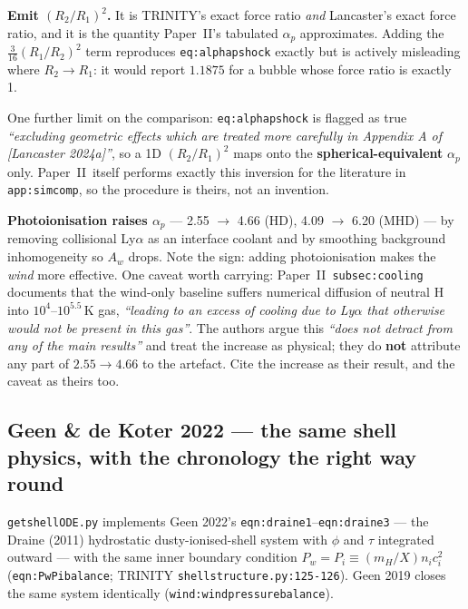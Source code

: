 \documentclass[11pt,a4paper,oneside]{report}
\newcommand{\brkus}{\textunderscore\allowbreak}
\newcommand{\code}[1]{\texttt{\small\let\_\brkus #1}}
\newcommand{\lbl}[1]{\texttt{\footnotesize\let\_\brkus #1}}
\newcommand{\PII}{Paper~II}
\newcommand{\ap}{\alpha_p}
\newcommand{\ci}{c_i}
\newcommand{\up}[1]{\textcolor{tqaccent}{\textbf{#1}}}
\begin{document}
\begin{keybox}
\up{Emit $(R_2/R_1)^2$.} It is TRINITY's exact force ratio \emph{and} Lancaster's exact force ratio,
and it is the quantity \PII's tabulated $\ap$ approximates. Adding the $\tfrac{3}{16}(R_1/R_2)^2$
term reproduces \lbl{eq:alphap\_shock} exactly but is actively misleading where $R_2\to R_1$: it
would report $1.1875$ for a bubble whose force ratio is exactly 1.
\end{keybox}

One further limit on the comparison: \lbl{eq:alphap\_shock} is flagged as true \emph{``excluding
geometric effects which are treated more carefully in Appendix A of [Lancaster 2024a]''}, so a 1D
$(R_2/R_1)^2$ maps onto the \up{spherical-equivalent} $\ap$ only. \PII\ itself performs exactly this
inversion for the literature in \lbl{app:sim\_comp}, so the procedure is theirs, not an invention.

\medskip
\textbf{Photoionisation raises $\ap$} --- 2.55 $\to$ 4.66 (HD), 4.09 $\to$ 6.20 (MHD) --- by
removing collisional Ly$\alpha$ as an interface coolant and by smoothing background
inhomogeneity so $A_w$ drops. Note the sign: adding photoionisation makes the \emph{wind}
more effective. One caveat worth carrying: \PII\ \lbl{subsec:cooling} documents that the
wind-only baseline suffers numerical diffusion of neutral H into $10^4$--$10^{5.5}$\,K gas,
\emph{``leading to an excess of cooling due to Ly$\alpha$ that otherwise would not be
present in this gas''}. The authors argue this \emph{``does not detract from any of the main results''}
and treat the increase as physical; they do \up{not} attribute any part of
$2.55 \to 4.66$ to the artefact. Cite the increase as their result, and the caveat as theirs
too.

\subsection{Geen \& de Koter 2022 --- the same shell physics, with the chronology the right
way round}
\label{sec:geen22}

\code{get\_shellODE.py} implements Geen 2022's \lbl{eqn:draine1}--\lbl{eqn:draine3} --- the
Draine (2011) hydrostatic dusty-ionised-shell system with $\phi$ and $\tau$ integrated
outward --- with the same inner boundary condition
$P_w = P_i \equiv (m_H/X)n_i\ci^2$ (\lbl{eqn:PwPibalance}; TRINITY
\code{shell\_structure.py:125-126}). Geen 2019 closes the same system identically
(\lbl{wind:windpressurebalance}).
\end{document}
